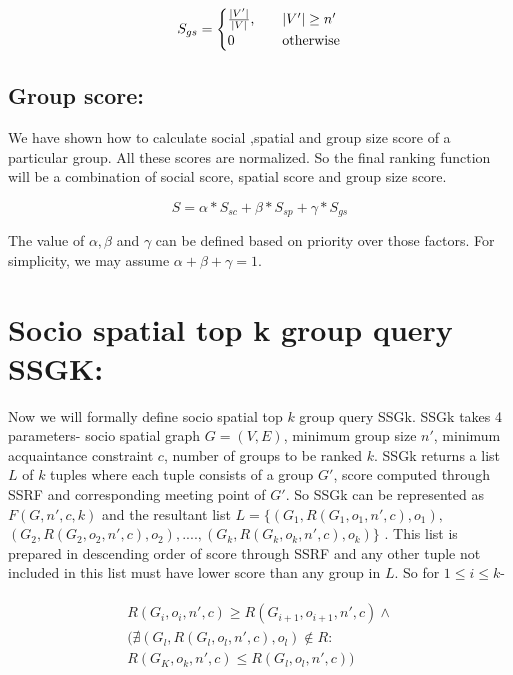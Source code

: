 \documentclass{vldb}
\begin{document}
		\[
			S_{gs}=
				\begin{cases}
				\text{$ \frac{|V'|}{|V|} $,} & \quad\text{$ |V'|\geq n'$}\\
				\text{0} & \quad\text{otherwise}							
				\end{cases}
		\]
		
		\subsection{Group score:} 
		We have shown how to calculate  social ,spatial  and group size score of a particular group. All these scores are normalized. So the final ranking function will be a combination of social score, spatial score and group size score. 
		
		
		
		\begin{equation}
		\label{eq:score}
		S=\alpha*S_{sc} + \beta*S_{sp} + \gamma*S_{gs} 
		\end{equation}  
		
		The value of $ \alpha, \beta $ and $ \gamma  $ can be defined based on priority over those factors. For simplicity, we may assume $ \alpha+ \beta+\gamma = 1 $.
		
		
		
		
		\section{Socio spatial top  k  group query  SSGK:}
			Now we will formally define socio spatial top $ k $ group query SSGk. SSGk takes 4 parameters-  socio spatial graph $ G=(V,E) $,  minimum group size $ n' $,  minimum acquaintance constraint $ c $, number of groups to be ranked $ k $. SSGk returns a list $ L $ of $ k $ tuples where each tuple consists of a group $ G' $, score computed through SSRF and corresponding meeting point of $ G' $.		So SSGk can be represented as $ F(G,n',c,k) $ and the 
			resultant list $ L=\{(G_1,R(G_1,o_1,n',c),o_1),$ 
			\\ $ (G_2,R(G_2,o_2,n',c),o_2),  ....,	
			(G_k,R(G_k,o_k,n',c),o_k)\} $ . This list is prepared in descending order of score through SSRF and any other tuple not included in this list must have lower score than any group in $ L $. So  for $ 1\leq i\leq k $-

			
			\begin{align*}
			\begin{split}
			R(G_i,o_i,n',c) \geq R(G_{i+1},o_{i+1},n',c) \wedge 
			\\
			(\nexists (G_l,R(G_l,o_l,n',c),o_l)
			\notin R:
			\\
			R(G_K,o_k,n',c) \leq R(G_l,o_l,n',c) )
			\end{split}
			\end{align*}
			
\end{document}
